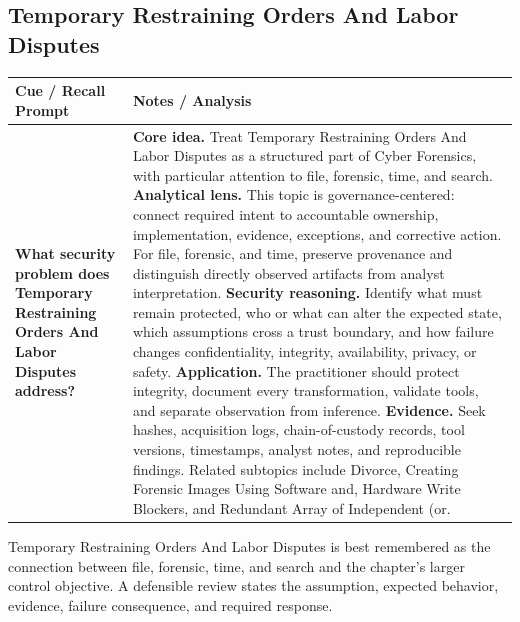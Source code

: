 \documentclass[11pt]{article}
\newcommand{\CornellHeader}{%
\rowcolor{Navy}\color{white}\bfseries Cue / Recall Prompt & \color{white}\bfseries Notes / Analysis\\\hline}
\newcommand{\CornellRow}[2]{%
\cellcolor{CueGray}\RaggedRight\textbf{#1} & \RaggedRight #2\\\hline}
\begin{document}
\subsection*{Temporary Restraining Orders And Labor Disputes}
\begin{longtable}{>{\RaggedRight\arraybackslash}p{}|>{\RaggedRight\arraybackslash}p{}}
\CornellHeader
\CornellRow{What security problem does Temporary Restraining Orders And Labor Disputes address?}{\textbf{Core idea.} Treat Temporary Restraining Orders And Labor Disputes as a structured part of Cyber Forensics, with particular attention to file, forensic, time, and search. \textbf{Analytical lens.} This topic is governance-centered: connect required intent to accountable ownership, implementation, evidence, exceptions, and corrective action. For file, forensic, and time, preserve provenance and distinguish directly observed artifacts from analyst interpretation. \textbf{Security reasoning.} Identify what must remain protected, who or what can alter the expected state, which assumptions cross a trust boundary, and how failure changes confidentiality, integrity, availability, privacy, or safety. \textbf{Application.} The practitioner should protect integrity, document every transformation, validate tools, and separate observation from inference. \textbf{Evidence.} Seek hashes, acquisition logs, chain-of-custody records, tool versions, timestamps, analyst notes, and reproducible findings. Related subtopics include Divorce, Creating Forensic Images Using Software and, Hardware Write Blockers, and Redundant Array of Independent (or.}
\end{longtable}
\begin{topicsummary}
Temporary Restraining Orders And Labor Disputes is best remembered as the connection between file, forensic, time, and search and the chapter's larger control objective. A defensible review states the assumption, expected behavior, evidence, failure consequence, and required response.
\end{topicsummary}
\end{document}
